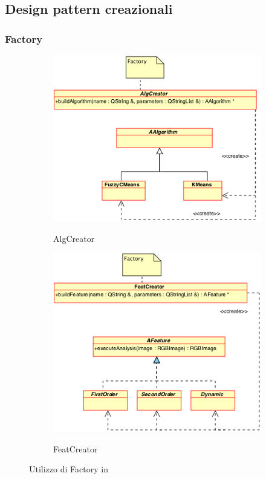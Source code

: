 \pagebreak

\subsection{Design pattern creazionali}
\label{patt_creazionali}
\subsubsection{Factory}
\label{creaz_factory}
\begin{figure}[!h]
	\centering
		\begin{subfigure}[b]{0.5\textwidth}
			\includegraphics[width=\textwidth]{./Content/Immagini/FactoryAlg.png}
			\label{factoryalg}
			\caption{AlgCreator}
		\end{subfigure}
		
		\begin{subfigure}[b]{0.5\textwidth}
			\includegraphics[width=\textwidth]{./Content/Immagini/FactoryFeatures.png}
			\label{factoryfeat}
			\caption{FeatCreator}
		\end{subfigure}
	\caption{Utilizzo di Factory in \project{}}
	\label{romeo_factory}
\end{figure}

